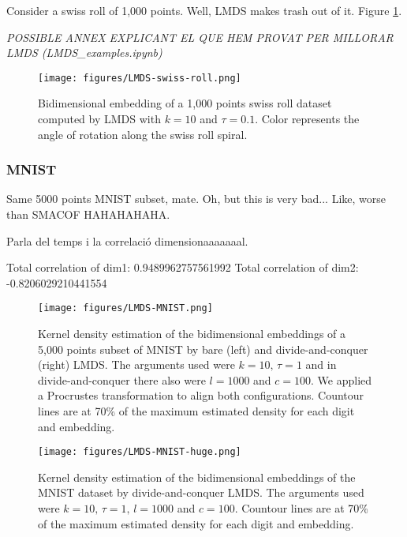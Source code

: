 Consider a swiss roll of 1,000 points. Well, LMDS makes trash out of it. Figure \ref{fig:LMDS-swiss-roll}.

\textit{POSSIBLE ANNEX EXPLICANT EL QUE HEM PROVAT PER MILLORAR LMDS (LMDS\_examples.ipynb)}

\begin{figure}[ht]
    \centering
    \texttt{[image: figures/LMDS-swiss-roll.png]}
    \caption{Bidimensional embedding of a 1,000 points swiss roll dataset \citep{Spiwokv2007} computed by LMDS with $k=10$ and $\tau = 0.1$. Color represents the angle of rotation along the swiss roll spiral.}
    \label{fig:LMDS-swiss-roll}
\end{figure}

\subsubsection{MNIST}

Same 5000 points MNIST subset, mate. Oh, but this is very bad... Like, worse than SMACOF HAHAHAHAHA.

Parla del temps i la correlació dimensionaaaaaaal.

Total correlation of dim1: 0.9489962757561992
Total correlation of dim2: -0.8206029210441554

\begin{figure}[ht]
    \centering
    \texttt{[image: figures/LMDS-MNIST.png]}
    \caption{Kernel density estimation of the bidimensional embeddings of a 5,000 points subset of MNIST \citep{Cohen2017} by bare (left) and divide-and-conquer (right) LMDS. The arguments used were $k=10,\, \tau = 1$ and in divide-and-conquer there also were $l=1000$ and $c=100$. We applied a Procrustes transformation to align both configurations. Countour lines are at 70\% of the maximum estimated density for each digit and embedding.}
    \label{fig:LMDS-MNIST}
\end{figure}

\begin{figure}[ht]
    \centering
    \texttt{[image: figures/LMDS-MNIST-huge.png]}
    \caption{Kernel density estimation of the bidimensional embeddings of the MNIST dataset \citep{Cohen2017} by divide-and-conquer LMDS. The arguments used were $k=10,\, \tau = 1, \, l=1000$ and $c=100$. Countour lines are at 70\% of the maximum estimated density for each digit and embedding.}
    \label{fig:LMDS-MNIST-huge}
\end{figure}

